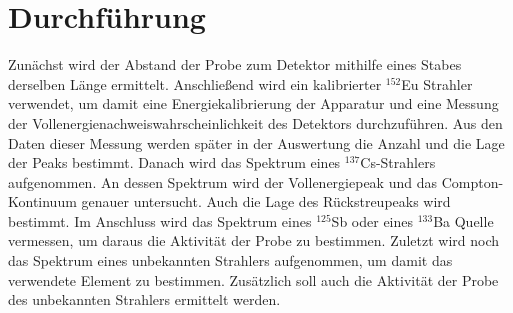 
\section{Durchführung}
\label{sec:Durchführung}
Zunächst wird der Abstand der Probe zum Detektor mithilfe eines Stabes derselben Länge ermittelt. Anschließend wird ein kalibrierter $^{152}$Eu Strahler verwendet, um damit eine Energiekalibrierung der Apparatur und eine Messung der Vollenergienachweiswahrscheinlichkeit des Detektors durchzuführen. Aus den Daten dieser Messung werden später in der Auswertung die Anzahl und die Lage der Peaks bestimmt. Danach wird das Spektrum eines $^{137}$Cs-Strahlers aufgenommen. An dessen Spektrum wird der Vollenergiepeak und das Compton-Kontinuum genauer untersucht. Auch die Lage des Rückstreupeaks wird bestimmt. Im Anschluss wird das Spektrum eines $^{125}$Sb oder eines $^{133}$Ba Quelle vermessen, um daraus die Aktivität der Probe zu bestimmen. Zuletzt wird noch das Spektrum eines unbekannten Strahlers aufgenommen, um damit das verwendete Element zu bestimmen. Zusätzlich soll auch die Aktivität der Probe des unbekannten Strahlers ermittelt werden.